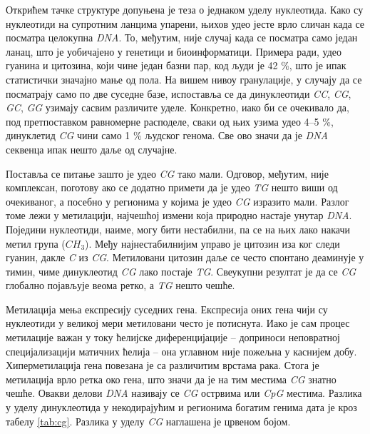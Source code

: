\documentclass[12pt,oneside]{memoir}
\begin{document}
Открићем тачке структуре допуњена је теза о једнаком уделу нуклеотида. Како су нуклеотиди на супротним ланцима упарени, њихов удео јесте врло сличан када се посматра целокупна \textit{DNA}. То, међутим, није случај када се посматра само један ланац, што је уобичајено у генетици и биоинформатици. Примера ради, удео гуанина и цитозина, који чине један базни пар, код људи је 42 \%, што је ипак статистички значајно мање од пола. На вишем нивоу гранулације, у случају да се посматрају само по две суседне базе, испоставља се да динуклеотиди \textit{CC}, \textit{CG}, \textit{GC}, \textit{GG} узимају сасвим различите уделе. Конкретно, иако би се очекивало да, под претпоставком равномерне расподеле, сваки од њих узима удео 4--5 \%, динуклетид \textit{CG} чини само 1 \% људског генома. Све ово значи да је \textit{DNA} секвенца ипак нешто даље од случајне.

Поставља се питање зашто је удео \textit{CG} тако мали. Одговор, међутим, није комплексан, поготову ако се додатно примети да је удео \textit{TG} нешто виши од очекиваног, а посебно у регионима у којима је удео \textit{CG} изразито мали. Разлог томе лежи у метилацији, најчешћој измени која природно настаје унутар \textit{DNA}. Поједини нуклеотиди, наиме, могу бити нестабилни, па се на њих лако накачи метил група ($CH_3$). Међу најнестабилнијим управо је цитозин иза ког следи гуанин, дакле \textit{C} из \textit{CG}. Метиловани цитозин даље се често спонтано деаминује у тимин, чиме динуклеотид \textit{CG} лако постаје \textit{TG}. Свеукупни резултат је да се \textit{CG} глобално појављује веома ретко, а \textit{TG} нешто чешће.

Метилација мења експресију суседних гена. Експресија оних гена чији су нуклеотиди у великој мери метиловани често је потиснута. Иако је сам процес метилације важан у току ћелијске диференцијације -- доприноси неповратној специјализацији матичних ћелија -- она углавном није пожељна у каснијем добу. Хиперметилација гена повезана је са различитим врстама рака. Стога је метилација врло ретка око гена, што значи да је на тим местима \textit{CG} знатно чешће. Овакви делови \textit{DNA} називају се \textit{CG} острвима или \textit{CpG} местима. Разлика у уделу динуклеотида у некодирајућим и регионима богатим генима дата је кроз табелу \ref{tab:cg}. Разлика у уделу \textit{CG} наглашена је црвеном бојом.
\end{document}
